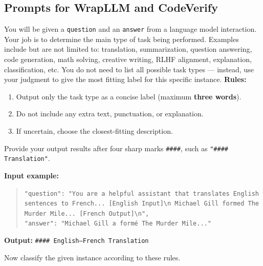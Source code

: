 \subsection{Prompts for WrapLLM and CodeVerify} \label{apd:prompt_wrap_code}


\begin{tcolorbox}[title={\texttt{TASK\_CLS\_PROMPT}}, breakable, colframe=blue!50!black, colback=blue!5]
You will be given a \texttt{question} and an \texttt{answer} from a language model interaction.  
Your job is to determine the main type of task being performed. Examples include but are not limited to: translation, summarization, question answering, code generation, math solving, creative writing, RLHF alignment, explanation, classification, etc.  
You do not need to list all possible task types — instead, use your judgment to give the most fitting label for this specific instance.  
\textbf{Rules:}  
\begin{enumerate}
    \item Output only the task type as a concise label (maximum \textbf{three words}).
    \item Do not include any extra text, punctuation, or explanation.
    \item If uncertain, choose the closest-fitting description.
\end{enumerate}

Provide your output results after four sharp marks \texttt{\#\#\#\#}, such as \texttt{"\#\#\#\# Translation"}.

\textbf{Input example:}  
\begin{quote}
\texttt{"question": "You are a helpful assistant that translates English sentences to French... [English Input]\textbackslash n Michael Gill formed The Murder Mile... [French Output]\textbackslash n",} \\
\texttt{"answer": "Michael Gill a formé The Murder Mile..." }
\end{quote}
\textbf{Output:}  
\texttt{\#\#\#\# English--French Translation}

Now classify the given instance according to these rules.
\end{tcolorbox}

